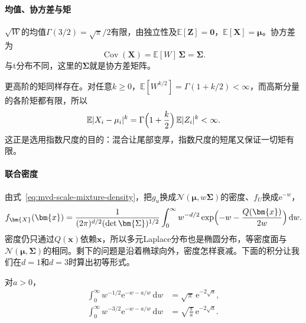 \paragraph{均值、协方差与矩}
$\sqrt W$的均值$\Gamma(3/2)=\sqrt\pi/2$有限，由独立性及$\mathbb{E}[\bm{Z}]=\bm{0}$，$\mathbb{E}[\bm{X}]=\bm{\mu}$。协方差为
\begin{equation}
 \operatorname{Cov}(\bm{X})=\mathbb{E}[W]\,\bm{\Sigma}=\bm{\Sigma} .
 \label{eq:mvd-laplace-cov}
\end{equation}
与t分布不同，这里的$\bm{\Sigma}$就是协方差矩阵。

更高阶的矩同样存在。对任意$k\geq0$，$\mathbb{E}[W^{k/2}]=\Gamma(1+k/2)<\infty$，而高斯分量的各阶矩都有限，所以
\[
 \mathbb{E}\lvert X_i-\mu_i\rvert^{k}=\Gamma\Bigl(1+\frac k2\Bigr)\,\mathbb{E}\lvert Z_i\rvert^{k}<\infty .
\]
这正是选用指数尺度的目的：混合让尾部变厚，指数尺度的短尾又保证一切矩有限。

\paragraph{联合密度}
由式~\eqref{eq:mvd-scale-mixture-density}，把$g_u$换成$\mathcal{N}(\bm{\mu},w\bm{\Sigma})$的密度、$f_U$换成$\mathrm{e}^{-w}$，
\begin{equation}
 f_{\bm{X}}(\bm{x})=\frac{1}{(2\pi)^{d/2}(\det\bm{\Sigma})^{1/2}}\int_0^{\infty}w^{-d/2}\exp\Bigl(-w-\frac{Q(\bm{x})}{2w}\Bigr)\,\mathrm{d}w .
 \label{eq:mvd-laplace-density}
\end{equation}
密度仍只通过$Q(\bm{x})$依赖$\bm{x}$，所以多元Laplace分布也是椭圆分布，等密度面与$\mathcal{N}(\bm{\mu},\bm{\Sigma})$的相同。剩下的问题是沿着椭球向外，密度怎样衰减。下面的积分让我们在$d=1$和$d=3$时算出初等形式。

\begin{lemma}[一个指数积分]
\label{lem:mvd-exp-integral}
对$a>0$，
\begin{equation}
 \begin{aligned}
  \int_0^{\infty}w^{-1/2}\mathrm{e}^{-w-a/w}\,\mathrm{d}w&=\sqrt\pi\,\mathrm{e}^{-2\sqrt a},\\
  \int_0^{\infty}w^{-3/2}\mathrm{e}^{-w-a/w}\,\mathrm{d}w&=\sqrt{\frac{\pi}{a}}\,\mathrm{e}^{-2\sqrt a} .
 \end{aligned}
 \label{eq:mvd-exp-integral}
\end{equation}
\end{lemma}

